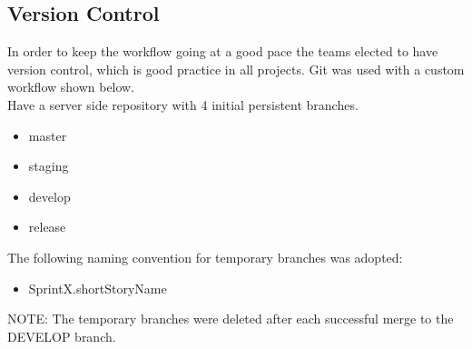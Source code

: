 \subsection{Version Control}
\label{sec:git}

In order to keep the workflow going at a good pace the teams elected to have version control, which is good practice in all projects. Git was used with a custom workflow shown below. \\

Have a server side repository with 4 initial persistent branches.
\begin{itemize}
\item master
\item staging
\item develop
\item release
\end{itemize}

The following naming convention for temporary branches was adopted: 

\begin{itemize}
\item SprintX.shortStoryName
\end{itemize}

NOTE: The temporary branches were deleted after each successful merge to the DEVELOP branch.


